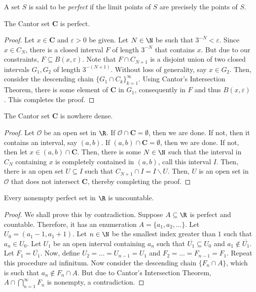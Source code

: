 \begin{definition}[\href{https://www.youtube.com/watch?v=2Vv-BfVoq4g&ab_channel=EdSheeran}{Perfect}]
    A set $S$ is said to be \textit{perfect} if the limit points of $S$ are precisely the points of $S$.
\end{definition}

\begin{proposition}
    The Cantor set $\mathbf C$ is perfect.
\end{proposition}
\begin{proof}
    Let $x\in\mathbf C$ and $\varepsilon > 0$ be given. Let $N\in\N$ be such that $3^{-N} < \varepsilon$. Since $x\in C_N$, there is a closed interval $F$ of length $3^{-N}$ that contains $x$. But due to our constraints, $F\subseteq B(x,\varepsilon)$. Note that $F\cap C_{N + 1}$ is a disjoint union of two closed intervals $G_1, G_2$ of length $3^{-(N + 1)}$. Without loss of generality, say $x\in G_2$. Then, consider the descending chain $\{G_1\cap C_k\}_{k = 1}^\infty$. Using Cantor's Intersection Theorem, there is some element of $\mathbf C$ in $G_1$, consequently in $F$ and thus $B(x,\varepsilon)$. This completes the proof.
\end{proof}

\begin{proposition}
    The Cantor set $\mathbf C$ is nowhere dense.
\end{proposition}
\begin{proof}
    Let $\mathcal O$ be an open set in $\R$. If $\mathcal O\cap\mathbf C = \emptyset$, then we are done. If not, then it contains an interval, say $(a,b)$. If $(a,b)\cap\mathbf C = \emptyset$, then we are done. If not, then let $x\in (a,b)\cap\mathbf C$. Then, there is some $N\in\N$ such that the interval in $C_N$ containing $x$ is completely contained in $(a,b)$, call this interval $I$. Then, there is an open set $U\subseteq I$ such that $C_{N + 1}\cap I = I\backslash U$. Then, $U$ is an open set in $\mathcal O$ that does not intersect $\mathbf C$, thereby completing the proof.
\end{proof}

\begin{lemma}
    Every nonempty perfect set in $\R$ is uncountable.
\end{lemma}
\begin{proof}
    We shall prove this by contradiction. Suppose $A\subseteq\R$ is perfect and countable. Therefore, it has an enumeration $A = \{a_1,a_2,\ldots\}$. Let $U_0 = (a_1 - 1, a_1 + 1)$. Let $n\in\N$ be the smallest index greater than $1$ such that $a_n\in U_0$. Let $U_1$ be an open interval containing $a_n$ such that $\overline{U_1}\subseteq U_0$ and $a_1\notin\overline{U_1}$. Let $F_1 = \overline{U_1}$. Now, define $U_2 = \ldots = U_{n - 1} = U_1$ and $F_2 = \ldots = F_{n - 1} = F_1$. Repeat this procedure ad infinitum. Now consider the descending chain $\{F_n\cap A\}$, which is such that $a_n\notin F_n\cap A$. But due to Cantor's Intersection Theorem, $A\cap \bigcap\limits_{n = 1}^\infty F_n$ is nonempty, a contradiction.
\end{proof}

